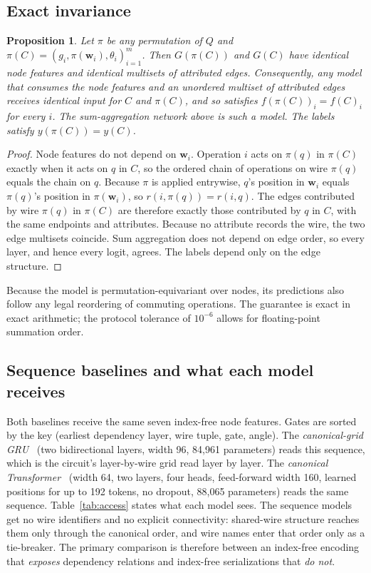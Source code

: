 \documentclass[conference,a4paper]{IEEEtran}
\newtheorem{proposition}{Proposition}
\begin{document}
\subsection{Exact invariance}
\begin{proposition}\label{prop:inv}
Let $\pi$ be any permutation of $Q$ and $\pi(C)=(g_i,\pi(\mathbf{w}_i),\theta_i)_{i=1}^m$. Then $G(\pi(C))$ and $G(C)$ have identical node features and identical multisets of attributed edges. Consequently, any model that consumes the node features and an unordered multiset of attributed edges receives identical input for $C$ and $\pi(C)$, and so satisfies $f(\pi(C))_i=f(C)_i$ for every $i$. The sum-aggregation network above is such a model. The labels satisfy $y(\pi(C))=y(C)$.
\end{proposition}
\begin{proof}
Node features do not depend on $\mathbf{w}_i$. Operation $i$ acts on $\pi(q)$ in $\pi(C)$ exactly when it acts on $q$ in $C$, so the ordered chain of operations on wire $\pi(q)$ equals the chain on $q$. Because $\pi$ is applied entrywise, $q$'s position in $\mathbf{w}_i$ equals $\pi(q)$'s position in $\pi(\mathbf{w}_i)$, so $r(i,\pi(q))=r(i,q)$. The edges contributed by wire $\pi(q)$ in $\pi(C)$ are therefore exactly those contributed by $q$ in $C$, with the same endpoints and attributes. Because no attribute records the wire, the two edge multisets coincide. Sum aggregation does not depend on edge order, so every layer, and hence every logit, agrees. The labels depend only on the edge structure.
\end{proof}
Because the model is permutation-equivariant over nodes, its predictions also follow any legal reordering of commuting operations. The guarantee is exact in exact arithmetic; the protocol tolerance of $10^{-6}$ allows for floating-point summation order.

\subsection{Sequence baselines and what each model receives}
Both baselines receive the same seven index-free node features. Gates are sorted by the key (earliest dependency layer, wire tuple, gate, angle). The \emph{canonical-grid GRU}~\cite{cho2014gru} (two bidirectional layers, width 96, 84,961 parameters) reads this sequence, which is the circuit's layer-by-wire grid read layer by layer. The \emph{canonical Transformer}~\cite{vaswani2017attention} (width 64, two layers, four heads, feed-forward width 160, learned positions for up to 192 tokens, no dropout, 88,065 parameters) reads the same sequence. Table~\ref{tab:access} states what each model sees. The sequence models get no wire identifiers and no explicit connectivity: shared-wire structure reaches them only through the canonical order, and wire names enter that order only as a tie-breaker. The primary comparison is therefore between an index-free encoding that \emph{exposes} dependency relations and index-free serializations that \emph{do not}.
\end{document}
